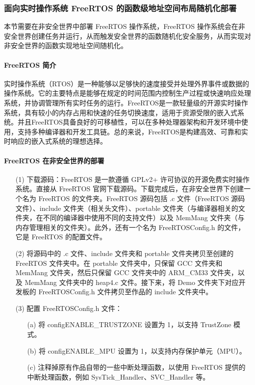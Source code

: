 \documentclass[UTF8,12pt,a4paper]{ctexart}
\numberwithin{figure}{section}
\begin{document}
\subsubsection{面向实时操作系统 FreeRTOS 的函数级地址空间布局随机化部署}
\par 本节需要在非安全世界中部署 FreeRTOS 操作系统，FreeRTOS 操作系统会在非安全世界创建任务并运行，从而触发安全世界的函数随机化安全服务，从而实现对非安全世界的函数实现地址空间随机化。
\paragraph{FreeRTOS 简介}
\par 实时操作系统（RTOS）是一种能够以足够快的速度接受并处理外界事件或数据的操作系统。它的主要特点是能够在规定的时间范围内控制生产过程或快速响应处理系统，并协调管理所有实时任务的运行。FreeRTOS是一款轻量级的开源实时操作系统，具有较小的内存占用和快速的任务切换速度，适用于资源受限的嵌入式系统。并且FreeRTOS具备良好的可移植性，可以在多种处理器架构和开发环境中使用，支持多种编译器和开发工具链。总的来说，FreeRTOS是构建高效、可靠和实时响应的嵌入式系统的理想选择。
\paragraph{FreeRTOS 在非安全世界的部署}
\begin{itemize}
    \item[(1)] 下载源码：FreeRTOS 是一款遵循 GPLv2+ 许可协议的开源免费实时操作系统。直接从 FreeRTOS 官网下载源码。下载完成后，在非安全世界下创建一个名为 FreeRTOS 的文件夹。FreeRTOS 源码包括 .c 文件（FreeRTOS 源码文件）、include 文件夹（相关头文件）、portable 文件夹（与编译器相关的文件夹，在不同的编译器中使用不同的支持文件）以及 MemMang 文件夹（与内存管理相关的文件夹）。此外，还有一个名为 FreeRTOSConfig.h 的文件，它是 FreeRTOS 的配置文件。
        
    \item[(2)] 将源码中的 .c 文件、include 文件夹和 portable 文件夹拷贝至创建的 FreeRTOS 文件夹中。在 portable 文件夹中，只保留 GCC 文件夹和 MemMang 文件夹，然后只保留 GCC 文件夹中的 ARM\_CM33 文件夹，以及 MemMang 文件夹中的 heap4.c 文件。接下来，将 Demo 文件夹下对应开发板的 FreeRTOSConfig.h 文件拷贝至作品的 include 文件夹中。
        
    \item[(3)] 配置 FreeRTOSConfig.h 文件：
        \begin{itemize}
            \item[(a)] 将 configENABLE\_TRUSTZONE 设置为 1，以支持 TrustZone 模式。
            \item[(b)] 将 configENABLE\_MPU 设置为 1，以支持内存保护单元（MPU）。
            \item[(c)] 注释掉原有作品自带的一些中断处理函数，以使用 FreeRTOS 提供的中断处理函数，例如 SysTick\_Handler、SVC\_Handler 等。
        \end{itemize}
\end{itemize}
\end{document}
